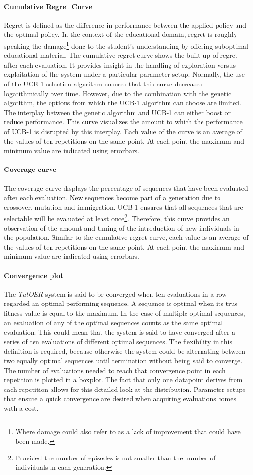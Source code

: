 \paragraph{Cumulative Regret Curve} Regret is defined as the difference in
performance between the applied policy and the optimal policy. In the context
of the educational domain, regret is roughly speaking the damage\footnote{Where
damage could also refer to as a lack of improvement that could have been made.}
done to the student's understanding by offering suboptimal educational
material. The cumulative regret curve shows the built-up of regret after each
evaluation. It provides insight in the handling of exploration versus
exploitation of the system under a particular parameter setup.
Normally, the use of the UCB-1 selection algorithm ensures that
this curve decreases logarithmically over time. However, due to the
combination with the genetic algorithm, the options from which the UCB-1
algorithm can choose are limited. The interplay between the genetic algorithm
and UCB-1 can either boost or reduce performance. This curve visualizes
the amount to which the performance of UCB-1 is disrupted by this interplay.
Each value of the curve is an average of the values of ten repetitions
on the same point. At each point the maximum and minimum value are indicated
using errorbars.
\paragraph{Coverage curve}
The coverage curve displays the percentage of sequences that have been
evaluated after each evaluation. New sequences become part of a generation due
to crossover, mutation and immigration. UCB-1 ensures that all sequences that
are selectable will be evaluated at least once\footnote{Provided the number of
episodes is not smaller than the number of individuals in each generation.}.
Therefore, this curve provides an observation of the amount and timing of the
introduction of new individuals in the population. Similar to the cumulative
regret curve, each value is an average of the values of ten repetitions on the
same point. At each point the maximum and minimum value are indicated using
errorbars.
\paragraph{Convergence plot}
The \emph{TutOER} system is said to be converged when ten evaluations in a row
regarded an optimal performing sequence. A sequence is optimal when its true
fitness value is equal to the maximum. In the case of multiple optimal
sequences, an evaluation of any of the optimal sequences counts as the same
optimal evaluation. This could mean that the system is said to have converged
after a series of ten evaluations of different optimal sequences. The
flexibility in this definition is required, because otherwise the system could
be alternating between two equally optimal sequences until termination without
being said to converge. The number of evaluations needed to reach that
convergence point in each repetition is plotted in a boxplot. The fact that
only one datapoint derives from each repetition allows for this detailed look
at the distribution. Parameter setups that ensure a quick convergence are
desired when acquiring evaluations comes with a cost.
